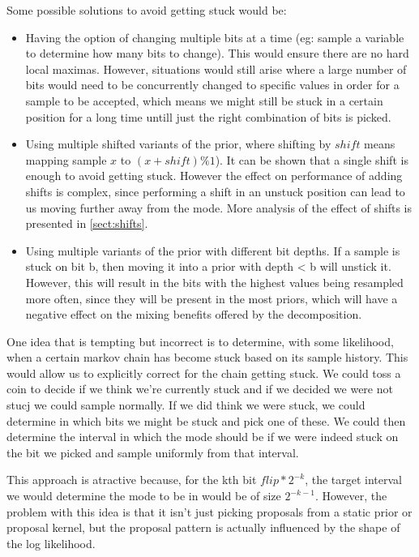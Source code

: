 Some possible solutions to avoid getting stuck would be:
\begin{itemize}

\item
Having the option of changing multiple bits at a time (eg: sample a variable to determine how many bits to change). This would ensure there are no hard local maximas. However, situations would still arise where a large number of bits would need to be concurrently changed to specific values in order for a sample to be accepted, which means we might still be stuck in a certain position for a long time untill just the right combination of bits is picked. 

\item
Using multiple shifted variants of the prior, where shifting by $shift$ means mapping sample $x$ to $(x + shift)\%1$). It can be shown that a single shift is enough to avoid getting stuck. However the effect on performance of adding shifts is complex, since performing a shift in an unstuck position can lead to us moving further away from the mode. More analysis of the effect of shifts is presented in \ref{sect:shifts}.

\item
Using multiple variants of the prior with different bit depths. If a sample is stuck on bit b, then moving it into a prior with depth < b will unstick it. However, this will result in the bits with the highest values being resampled more often, since they will be present in the most priors, which will have a negative effect on the mixing benefits offered by the decomposition. 

\end{itemize}

One idea that is tempting but incorrect is to determine, with some likelihood, when a certain markov chain has become stuck based on its sample history. This would allow us to explicitly correct for the chain getting stuck. We could toss a coin to decide if we think we're currently stuck and if we decided we were not stucj we could sample normally. If we did think we were stuck, we could determine in which bits we might be stuck and pick one of these. We could then determine the interval in which the mode should be if we were indeed stuck on the bit we picked and sample uniformly from that interval.

This approach is atractive because, for the kth bit $flip*2^{-k}$, the target interval we would determine the mode to be in would be of size $2^{-k-1}$. However, the problem with this idea is that it isn't just picking proposals from a static prior or proposal kernel, but the proposal pattern is actually influenced by the shape of the log likelihood. 

